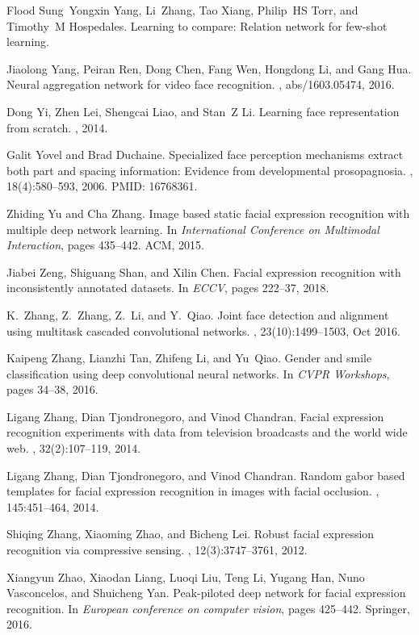 \documentclass[journal]{IEEEtran}
\begin{document}
\begin{thebibliography}{10}
Flood Sung~Yongxin Yang, Li~Zhang, Tao Xiang, Philip~HS Torr, and Timothy~M
Hospedales.
\newblock Learning to compare: Relation network for few-shot learning.

Jiaolong Yang, Peiran Ren, Dong Chen, Fang Wen, Hongdong Li, and Gang Hua.
\newblock Neural aggregation network for video face recognition.
, abs/1603.05474, 2016.

Dong Yi, Zhen Lei, Shengcai Liao, and Stan~Z Li.
\newblock Learning face representation from scratch.
, 2014.

Galit Yovel and Brad Duchaine.
\newblock Specialized face perception mechanisms extract both part and spacing
information: Evidence from developmental prosopagnosia.
, 18(4):580--593, 2006.
\newblock PMID: 16768361.

Zhiding Yu and Cha Zhang.
\newblock Image based static facial expression recognition with multiple deep
network learning.
\newblock In {\em International Conference on Multimodal Interaction}, pages
435--442. ACM, 2015.

Jiabei Zeng, Shiguang Shan, and Xilin Chen.
\newblock Facial expression recognition with inconsistently annotated datasets.
\newblock In {\em ECCV}, pages 222--37, 2018.

K.~Zhang, Z.~Zhang, Z.~Li, and Y.~Qiao.
\newblock Joint face detection and alignment using multitask cascaded
convolutional networks.
, 23(10):1499--1503, Oct 2016.

Kaipeng Zhang, Lianzhi Tan, Zhifeng Li, and Yu~Qiao.
\newblock Gender and smile classification using deep convolutional neural
networks.
\newblock In {\em CVPR Workshops}, pages 34--38, 2016.

Ligang Zhang, Dian Tjondronegoro, and Vinod Chandran.
\newblock Facial expression recognition experiments with data from television
broadcasts and the world wide web.
, 32(2):107--119, 2014.

Ligang Zhang, Dian Tjondronegoro, and Vinod Chandran.
\newblock Random gabor based templates for facial expression recognition in
images with facial occlusion.
, 145:451--464, 2014.

Shiqing Zhang, Xiaoming Zhao, and Bicheng Lei.
\newblock Robust facial expression recognition via compressive sensing.
, 12(3):3747--3761, 2012.

Xiangyun Zhao, Xiaodan Liang, Luoqi Liu, Teng Li, Yugang Han, Nuno Vasconcelos,
and Shuicheng Yan.
\newblock Peak-piloted deep network for facial expression recognition.
\newblock In {\em European conference on computer vision}, pages 425--442.
Springer, 2016.
	
\end{thebibliography}
\end{document}
